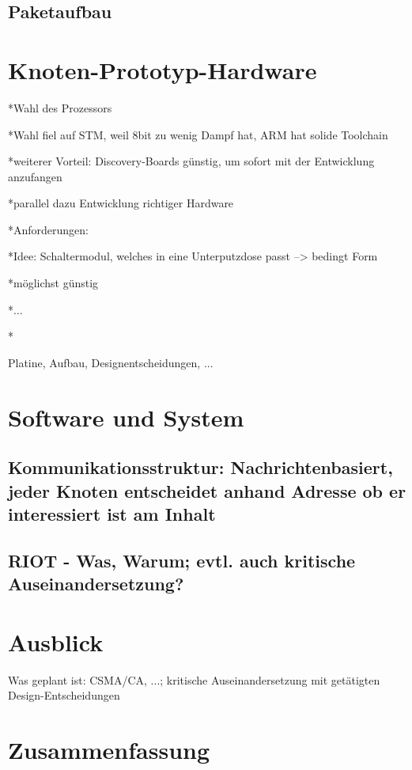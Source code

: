 \documentclass{IEEEtran}
\begin{document}
    \subsection{Paketaufbau}

\section{Knoten-Prototyp-Hardware}
*Wahl des Prozessors

*Wahl fiel auf STM, weil 8bit zu wenig Dampf hat, ARM hat solide Toolchain

*weiterer Vorteil: Discovery-Boards günstig, um sofort mit der Entwicklung anzufangen



*parallel dazu Entwicklung richtiger Hardware

*Anforderungen:

*Idee: Schaltermodul, welches in eine Unterputzdose passt --> bedingt Form

*möglichst günstig

*...



*

    Platine, Aufbau, Designentscheidungen, ...


\section{Software und System}
    \subsection{Kommunikationsstruktur: Nachrichtenbasiert, jeder Knoten entscheidet anhand Adresse ob er interessiert ist am Inhalt}
    \subsection{RIOT - Was, Warum; evtl. auch kritische Auseinandersetzung?}


\section{Ausblick}
Was geplant ist: CSMA/CA, ...;
kritische Auseinandersetzung mit getätigten Design-Entscheidungen

\section{Zusammenfassung}
\end{document}
